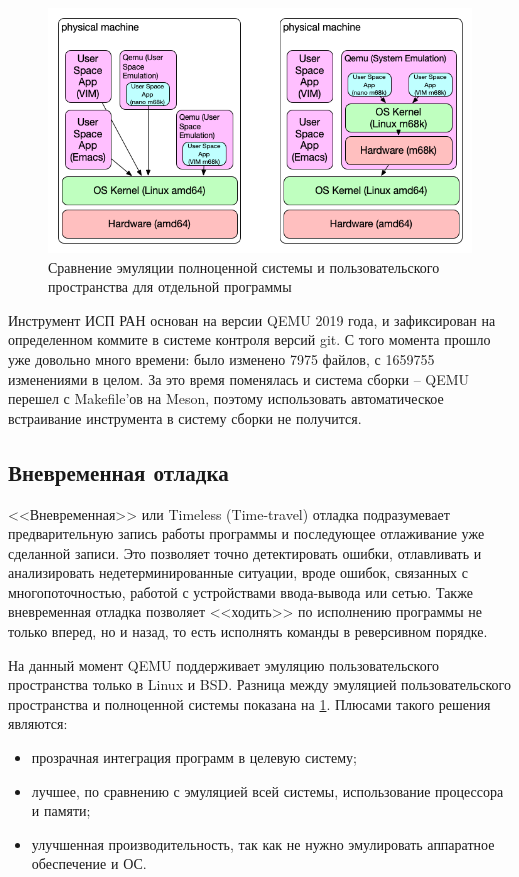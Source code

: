 \begin{figure}[!htbp]
    \centering
    \begin{adjustbox}{max totalsize={0.8\textwidth}{\textheight}}
        \includegraphics[]{images/qemu-userspace.png}
    \end{adjustbox}
    \caption{Сравнение эмуляции полноценной системы и пользовательского пространства для отдельной программы}\label{fig:qemu-userspace}
\end{figure}

Инструмент ИСП РАН основан на версии QEMU 2019 года, и зафиксирован на определенном коммите в системе
контроля версий git. С того момента прошло уже довольно много времени: было изменено 7975 файлов, с 1659755 изменениями в целом.
За это время поменялась и система сборки -- QEMU перешел с Makefile'ов на Meson, поэтому
использовать автоматическое встраивание инструмента в систему сборки не получится.

\subsection{Вневременная отладка}\label{sec:ch1/sec2/sub1}

<<Вневременная>> или Timeless (Time-travel) отладка подразумевает предварительную запись работы программы и
последующее отлаживание уже сделанной записи. Это позволяет точно детектировать ошибки, отлавливать и
анализировать недетерминированные ситуации, вроде ошибок, связанных с многопоточностью, работой с
устройствами ввода-вывода или сетью. Также вневременная отладка позволяет <<ходить>> по исполнению
программы не только вперед, но и назад, то есть исполнять команды в реверсивном порядке.

На данный момент QEMU поддерживает эмуляцию пользовательского пространства только в Linux и BSD.
Разница между эмуляцией пользовательского пространства и полноценной системы показана на 
\cref{fig:qemu-userspace}.
Плюсами такого решения являются:
\begin{itemize}
    \item прозрачная интеграция программ в целевую систему;
    \item лучшее, по сравнению с эмуляцией всей системы, использование процессора и памяти;
    \item улучшенная производительность, так как не нужно эмулировать аппаратное обеспечение и ОС.
\end{itemize}


